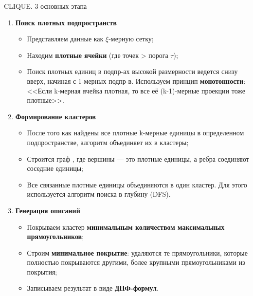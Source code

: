 \documentclass[unicode, notheorems, handout]{beamer}
\begin{document}
\begin{frame}{CLIQUE. 3 основных этапа}
\footnotesize
    \begin{enumerate}
        \item \textbf{Поиск плотных подпространств}
        \begin{itemize}
         \scriptsize
            \item Представляем данные как $\xi$-мерную сетку;
            
            \item Находим \textbf{плотные ячейки} (где точек > порога $\tau$);
            
            \item Поиск плотных единиц в подпр-ах высокой размерности ведется снизу вверх, начиная с 1-мерных подпр-в. Используем принцип \textbf{монотонности}: <<Если k-мерная ячейка плотная, то все её (k-1)-мерные проекции тоже плотные>>.
        \end{itemize}
        
        \item \textbf{Формирование кластеров}
        \begin{itemize}
           \scriptsize
            \item После того как найдены все плотные k-мерные единицы в определенном подпространстве, алгоритм объединяет их в кластеры;
            
            \item Строится граф , где вершины --- это плотные единицы, а ребра соединяют соседние единицы;
            
            \item Все связанные плотные единицы объединяются в один кластер. Для этого используется алгоритм поиска в глубину (DFS).
        \end{itemize}
        
        \item \textbf{Генерация описаний}
        \begin{itemize}
            \scriptsize
            \item Покрываем кластер \textbf{минимальным количеством максимальных прямоугольников};

            \item Строим \textbf{минимальное покрытие}: удаляются те прямоугольники, которые полностью покрываются другими, более крупными прямоугольниками из покрытия;
            
            \item Записываем результат в виде \textbf{ДНФ-формул}.
        \end{itemize}
    \end{enumerate}
\end{frame}
\end{document}
